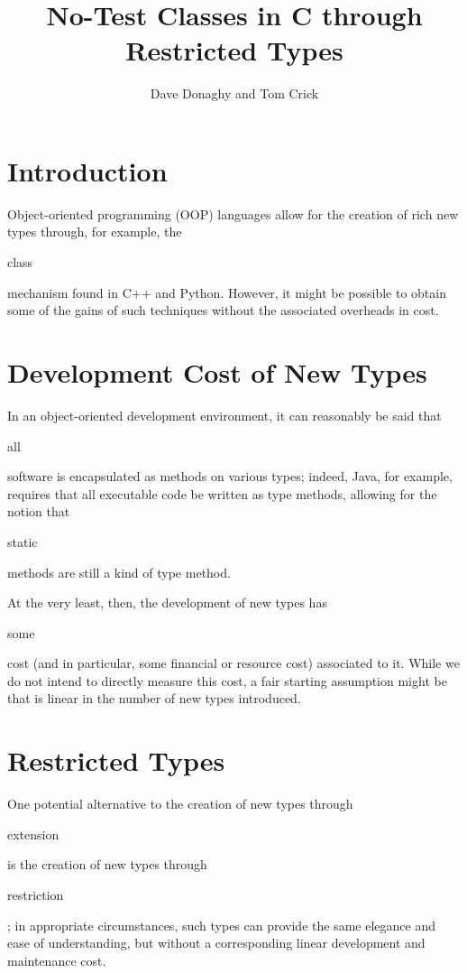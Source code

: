 \documentclass{eceasst}
\title{No-Test Classes in C through Restricted Types} %
\author{%
Dave Donaghy\autref{1} and 
Tom Crick\autref{2}}
\institute{%
\autlabel{1} \email{dave.donaghy@hp.com}\\
HP Bristol, UK\par
\autlabel{2} \email{tcrick@cardiffmet.ac.uk}\\
Department of Computing\\
Cardiff Metropolitan University, UK}
\begin{document}
\maketitle

\section{Introduction}

Object-oriented programming (OOP) languages allow for the creation of
rich new types through, for example, the \begin{tt}class\end{tt}
mechanism found in C++ and Python. However, it might be possible to
obtain some of the gains of such techniques without the associated
overheads in cost.

\section{Development Cost of New Types}

In an object-oriented development environment, it can reasonably be
said that \begin{em}all\end{em} software is encapsulated as methods on various
types; indeed, Java, for example, requires that all executable code be
written as type methods, allowing for the notion that
\begin{tt}static\end{tt} methods are still a kind of type method.

At the very least, then, the development of new types has
\begin{em}some\end{em} cost (and in particular, some financial or
resource cost) associated to it.  While we do not intend to directly
measure this cost, a fair starting assumption might be that is linear
in the number of new types introduced.

\section{Restricted Types}
One potential alternative to the creation of new types through
\begin{em}extension\end{em} is the creation of new types through
\begin{em}restriction\end{em}; in appropriate circumstances, such types
can provide the same elegance and ease of understanding, but without a
corresponding linear development and maintenance cost.
\end{document}
